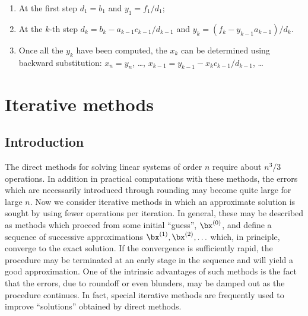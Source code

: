 \begin{enumerate}
\item At the first step $d_1=b_1$ and $y_1=f_1/d_1$;
\item At the $k$-th step $d_k=b_k-a_{k-1}c_{k-1}/d_{k-1}$ and
  $y_k=(f_k-y_{k-1} a_{k-1})/d_k$.
%
\item Once all the $y_k$ have been computed, the $x_k$ can be
  determined using backward substitution: $x_n = y_n$, \ldots,
  $x_{k-1}=y_{k-1}-x_k c_{k-1}/d_{k-1}$, \ldots
\end{enumerate}

\section{Iterative methods}

\subsection{Introduction}

The direct methods for solving linear systems of order $n$ require
about $n^3/3$ operations.   In addition in practical computations with
these methods, the errors which are necessarily introduced through
rounding may become quite large for large $n$.   Now we consider
iterative methods in which an approximate solution is sought by using
fewer operations per iteration.   In general, these may be described
as methods which proceed from some initial ``guess'', $\bx^{(0)}$, and
define a sequence of successive approximations $\bx^{(1)}, \bx^{(2)},
\ldots$ which, in principle, converge to the exact solution.    If the
convergence is sufficiently rapid, the procedure may be terminated at
an early stage in the sequence and will yield a good approximation.
One of the intrinsic advantages of such methods is the fact that the
errors, due to roundoff or even blunders, may be damped out as the
procedure continues.   In fact, special iterative methods are
frequently used to improve ``solutions'' obtained by direct methods.


